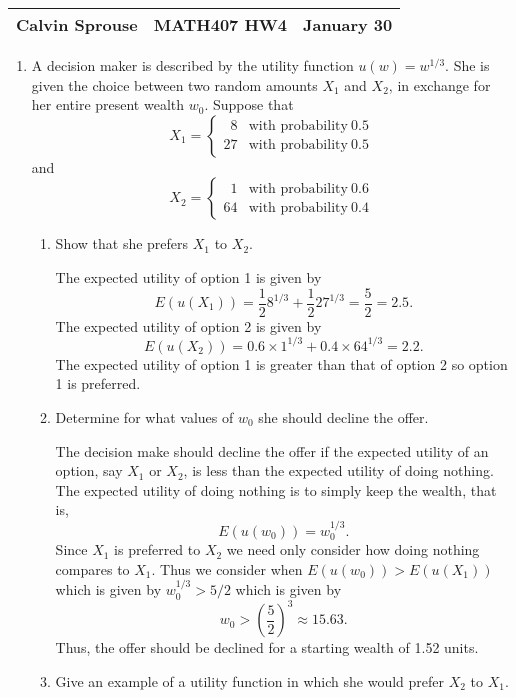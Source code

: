 \documentclass[a4paper, 12pt]{config/homework}
\begin{document}
\noindent
\begin{tabularx}{\textwidth}{>{\centering\arraybackslash}X>{\centering\arraybackslash}X>{\centering\arraybackslash}X}
Calvin Sprouse & MATH407 HW4 & 2024 January 30\\
\midrule
\end{tabularx}

\begin{enumerate}
\item A decision maker is described by the utility function \(u(w)=w^{1/3}\). She is given the choice between two random amounts \(X_1\) and \(X_2\), in exchange for her entire present wealth \(w_0\). Suppose that
\[X_1 = \begin{cases}
\phantom{0}8 & \text{with probability}\ 0.5 \\
27 & \text{with probability}\ 0.5
\end{cases}\] and
\[X_2 = \begin{cases}
\phantom{0}1 & \text{with probability}\ 0.6 \\
64 & \text{with probability}\ 0.4
\end{cases}\]
\begin{enumerate}[label=(\alph*)]
\item Show that she prefers \(X_1\) to \(X_2\).

The expected utility of option 1 is given by
\[E(u(X_1)) = \frac{1}{2}8^{1/3} + \frac{1}{2}27^{1/3} = \frac{5}{2} = 2.5.\]
The expected utility of option 2 is given by
\[E(u(X_2)) = 0.6\times1^{1/3} + 0.4\times64^{1/3} = 2.2.\]
The expected utility of option 1 is greater than that of option 2 so option 1 is preferred.

\item Determine for what values of \(w_0\) she should decline the offer.

The decision make should decline the offer if the expected utility of an option, say \(X_1\) or \(X_2\), is less than the expected utility of doing nothing. The expected utility of doing nothing is to simply keep the wealth, that is,
\[E(u(w_0)) = w_0^{1/3}.\]
Since \(X_1\) is preferred to \(X_2\) we need only consider how doing nothing compares to \(X_1\). Thus we consider when \(E(u(w_0)) > E(u(X_1))\) which is given by \(w_0^{1/3} > 5/2\) which is given by
\[w_0 > \left(\frac{5}{2}\right)^{3} \approx 15.63.\]
Thus, the offer should be declined for a starting wealth of 1.52 units.

\item Give an example of a utility function in which she would prefer \(X_2\) to \(X_1\).


\end{enumerate}
\end{enumerate}
\end{document}
